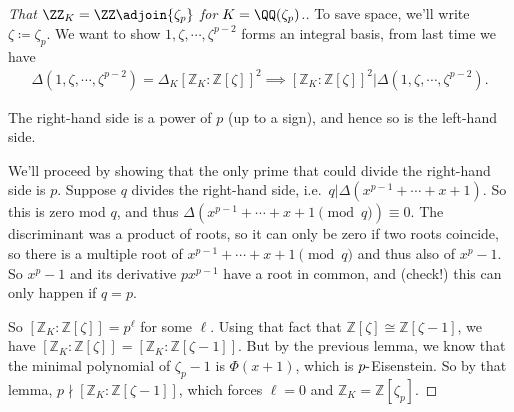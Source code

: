 \begin{proof}[That $\ZZ_K = \ZZ\adjoin{\zeta_p}$ for $K = \QQ(\zeta_p)$.]

To save space, we'll write \(\zeta \coloneqq\zeta_p\). We want to show
\(1, \zeta, \cdots, \zeta^{p-2}\) forms an integral basis, from last
time we have
\begin{align*}
{\Delta}( 1, \zeta, \cdots, \zeta^{p-2}) = 
{\Delta}_K 
[{\mathbb{Z}}_K : {\mathbb{Z}}[ \zeta ] ]^2 
\implies
[{\mathbb{Z}}_K : {\mathbb{Z}}[ \zeta ] ]^2 
\mathrel{\Big|}
{\Delta}( 1, \zeta, \cdots, \zeta^{p-2}) 
.\end{align*}

\begin{claim}

The right-hand side is a power of \(p\) (up to a sign), and hence so is
the left-hand side.

\end{claim}

We'll proceed by showing that the only prime that could divide the
right-hand side is \(p\). Suppose \(q\) divides the right-hand side,
i.e.~\(q \mathrel{\Big|}{\Delta}(x^{p-1} + \cdots + x + 1)\). So this is
zero mod \(q\), and thus
\({\Delta}( x^{p-1} + \cdots + x + 1 \pmod q) \equiv 0\). The
discriminant was a product of roots, so it can only be zero if two roots
coincide, so there is a multiple root of
\(x^{p-1} + \cdots + x + 1 \pmod q\) and thus also of \(x^p - 1\). So
\(x^p-1\) and its derivative \(px^{p-1}\) have a root in common, and
(check!) this can only happen if \(q=p\).

\hfill\break

So \([{\mathbb{Z}}_K : {\mathbb{Z}}[\zeta] ] = p^\ell\) for some
\(\ell\). Using that fact that
\({\mathbb{Z}}[ \zeta] \cong {\mathbb{Z}}[ \zeta - 1]\), we have
\([ {\mathbb{Z}}_K : {\mathbb{Z}}[ \zeta] ] = [ {\mathbb{Z}}_K: {\mathbb{Z}}[\zeta - 1] ]\).
But by the previous lemma, we know that the minimal polynomial of
\(\zeta_p - 1\) is \(\Phi(x+1)\), which is \(p{\hbox{-}}\)Eisenstein. So
by that lemma, \(p\nmid[{\mathbb{Z}}_K: {\mathbb{Z}}[ \zeta - 1]]\),
which forces \(\ell = 0\) and
\({\mathbb{Z}}_K = {\mathbb{Z}}[ \zeta_p ]\).

\end{proof}

